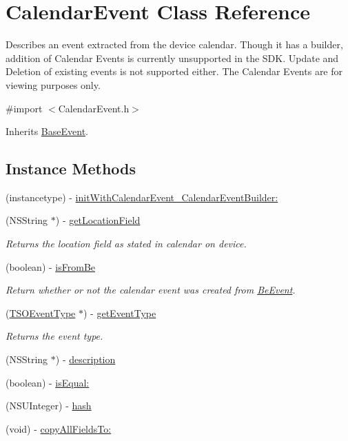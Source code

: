 \hypertarget{interface_calendar_event}{}\section{Calendar\+Event Class Reference}
\label{interface_calendar_event}


Describes an event extracted from the device calendar. Though it has a builder, addition of Calendar Events is currently unsupported in the S\+D\+K. Update and Deletion of existing events is not supported either. The Calendar Events are for viewing purposes only.  




{\ttfamily \#import $<$Calendar\+Event.\+h$>$}



Inherits \hyperlink{interface_base_event}{Base\+Event}.

\subsection*{Instance Methods}
\begin{DoxyCompactItemize}
\item 
(instancetype) -\/ \hyperlink{interface_calendar_event_a91712a9ff0234c0453e381b75bd1c117}{init\+With\+Calendar\+Event\+\_\+\+Calendar\+Event\+Builder\+:}
\item 
(N\+S\+String $\ast$) -\/ \hyperlink{interface_calendar_event_a57dfed5e8aa63d363290a9ace0a32be2}{get\+Location\+Field}
\begin{DoxyCompactList}\small\item\em Returns the location field as stated in calendar on device. \end{DoxyCompactList}\item 
(boolean) -\/ \hyperlink{interface_calendar_event_a0a1050d6e7d21d6112b86ab37dc2948b}{is\+From\+Be}
\begin{DoxyCompactList}\small\item\em Return whether or not the calendar event was created from \hyperlink{interface_be_event}{Be\+Event}. \end{DoxyCompactList}\item 
(\hyperlink{interface_t_s_o_event_type}{T\+S\+O\+Event\+Type} $\ast$) -\/ \hyperlink{interface_calendar_event_a317a711a65dffbcd6b3072f71f4c471b}{get\+Event\+Type}
\begin{DoxyCompactList}\small\item\em Returns the event type. \end{DoxyCompactList}\item 
(N\+S\+String $\ast$) -\/ \hyperlink{interface_calendar_event_a8de7d40afbde448418e85373c80b3652}{description}
\item 
(boolean) -\/ \hyperlink{interface_calendar_event_a63f5a36a02abb63feee80343580afc73}{is\+Equal\+:}
\item 
(N\+S\+U\+Integer) -\/ \hyperlink{interface_calendar_event_a154c2ff8ac25ef560a6808bc41b964f8}{hash}
\item 
(void) -\/ \hyperlink{interface_calendar_event_acff8973328110a1fb252ac8f0eb44a56}{copy\+All\+Fields\+To\+:}
\end{DoxyCompactItemize}
